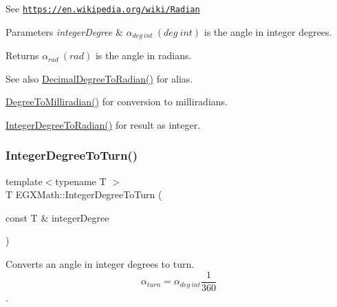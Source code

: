 See \href{https://en.wikipedia.org/wiki/Radian}{\tt https\+://en.\+wikipedia.\+org/wiki/\+Radian} 
\begin{DoxyParams}{Parameters}
{\em integer\+Degree} & $\alpha_{deg\ int}\ (deg\ int)$ is the angle in integer degrees. \\
\hline
\end{DoxyParams}
\begin{DoxyReturn}{Returns}
$\alpha_{rad}\ (rad)$ is the angle in radians. 
\end{DoxyReturn}
\begin{DoxySeeAlso}{See also}
\mbox{\hyperlink{group___e_g_x_math-_angle_conversions-_decimal_degree_ga906ee2c83cdf4caa59eb613dc2d5d52a}{Decimal\+Degree\+To\+Radian()}} for alias. 

\mbox{\hyperlink{group___e_g_x_math-_angle_conversions-_degree_gae4fa6c2d3805430760783650cfbfdb11}{Degree\+To\+Milliradian()}} for conversion to milliradians. 

\mbox{\hyperlink{group___e_g_x_math-_angle_conversions-_integer_degree_ga05d3368b00ea27b9895de2ffe5c8df38}{Integer\+Degree\+To\+Radian()}} for result as integer. 
\end{DoxySeeAlso}
\mbox{\label{group___e_g_x_math-_angle_conversions-_integer_degree_ga06ddbdada5a3978105c855d4aae735ae}} 
\subsubsection{\texorpdfstring{Integer\+Degree\+To\+Turn()}{IntegerDegreeToTurn()}}
{\footnotesize\ttfamily template$<$typename T $>$ \\
T E\+G\+X\+Math\+::\+Integer\+Degree\+To\+Turn (\begin{DoxyParamCaption}\item[{const T \&}]{integer\+Degree }\end{DoxyParamCaption})}



Converts an angle in integer degrees to turn. \[\alpha_{turn}=\alpha_{deg\ int}\frac{1}{360}\]. 

